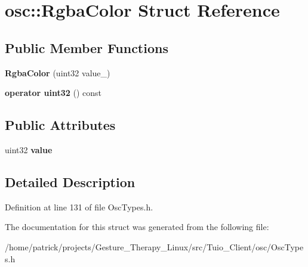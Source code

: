 \hypertarget{structosc_1_1_rgba_color}{}\section{osc\+:\+:Rgba\+Color Struct Reference}
\label{structosc_1_1_rgba_color}
\subsection*{Public Member Functions}
\begin{DoxyCompactItemize}
\item 
\mbox{\label{structosc_1_1_rgba_color_a350b04ba3a8f3d6de7f1510835ee5830}} 
{\bfseries Rgba\+Color} (uint32 value\+\_\+)
\item 
\mbox{\label{structosc_1_1_rgba_color_a527e7bcff41e84710e636d67d46d1c82}} 
{\bfseries operator uint32} () const
\end{DoxyCompactItemize}
\subsection*{Public Attributes}
\begin{DoxyCompactItemize}
\item 
\mbox{\label{structosc_1_1_rgba_color_a43ae2f693630ee13c8c9cbcae4d2f515}} 
uint32 {\bfseries value}
\end{DoxyCompactItemize}


\subsection{Detailed Description}


Definition at line 131 of file Osc\+Types.\+h.



The documentation for this struct was generated from the following file\+:\begin{DoxyCompactItemize}
\item 
/home/patrick/projects/\+Gesture\+\_\+\+Therapy\+\_\+\+Linux/src/\+Tuio\+\_\+\+Client/osc/Osc\+Types.\+h\end{DoxyCompactItemize}

